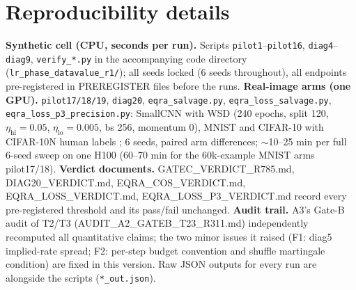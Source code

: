 \documentclass{article}
\begin{document}
\section{Reproducibility details}
\label{app:repro}
\textbf{Synthetic cell (CPU, seconds per run).} Scripts \texttt{pilot1}--\texttt{pilot16},
\texttt{diag4}--\texttt{diag9}, \texttt{verify\_*.py} in the accompanying code directory
(\texttt{lr\_phase\_datavalue\_r1/}); all seeds locked (6 seeds throughout), all endpoints
pre-registered in PREREGISTER files before the runs. \textbf{Real-image arms (one GPU).}
\texttt{pilot17/18/19}, \texttt{diag20}, \texttt{eqra\_salvage.py},
\texttt{eqra\_loss\_salvage.py}, \texttt{eqra\_loss\_p3\_precision.py}: SmallCNN with WSD
(240 epochs, split 120, $\eta_{\mathrm{hi}}{=}0.05$, $\eta_{\mathrm{lo}}{=}0.005$, bs 256,
momentum 0), MNIST and CIFAR-10 with CIFAR-10N human labels \citep{wei2022cifar10n}; 6 seeds,
paired arm differences; $\sim$10--25 min per full 6-seed sweep on one H100 (60--70 min for the 60k-example MNIST arms pilot17/18). \textbf{Verdict
documents.} GATEC\_VERDICT\_R785.md, DIAG20\_VERDICT.md, EQRA\_COS\_VERDICT.md,
EQRA\_LOSS\_VERDICT.md, EQRA\_LOSS\_P3\_VERDICT.md record every pre-registered threshold and
its pass/fail unchanged. \textbf{Audit trail.} A3's Gate-B audit of T2/T3
(AUDIT\_A2\_GATEB\_T23\_R311.md) independently recomputed all quantitative claims; the two
minor issues it raised (F1: diag5 implied-rate spread; F2: per-step budget convention and
shuffle martingale condition) are fixed in this version. Raw JSON outputs for every run are
alongside the scripts (\texttt{*\_out.json}).

%
\end{document}
